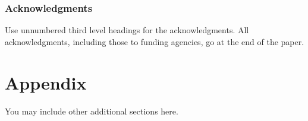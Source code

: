 \documentclass{article} %
\begin{document}
\subsubsection*{Acknowledgments}
Use unnumbered third level headings for the acknowledgments. All
acknowledgments, including those to funding agencies, go at the end of the paper.





\appendix
\section{Appendix}
You may include other additional sections here.
\end{document}
